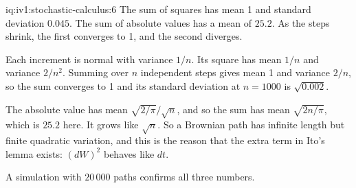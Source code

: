 \begin{solution}{iq:iv1:stochastic-calculus:6}
The sum of squares has mean 1 and standard deviation $0.045$. The sum of absolute values has a mean of $25.2$. As the steps shrink, the first converges to 1, and the second diverges.

Each increment is normal with variance $1/n$. Its square has mean $1/n$ and variance $2/n^2$. Summing over $n$ independent steps gives mean 1 and variance $2/n$, so the sum converges to 1 and its standard deviation at $n = 1000$ is $\sqrt{0.002}$.

The absolute value has mean $\sqrt{2/\pi}/\sqrt{n}$, and so the sum has mean $\sqrt{2n/\pi}$, which is $25.2$ here. It grows like $\sqrt{n}$. So a Brownian path has infinite length but finite quadratic variation, and this is the reason that the extra term in Ito's lemma exists: $(dW)^2$ behaves like $dt$.

A simulation with $20\,000$ paths confirms all three numbers.



\end{solution}

